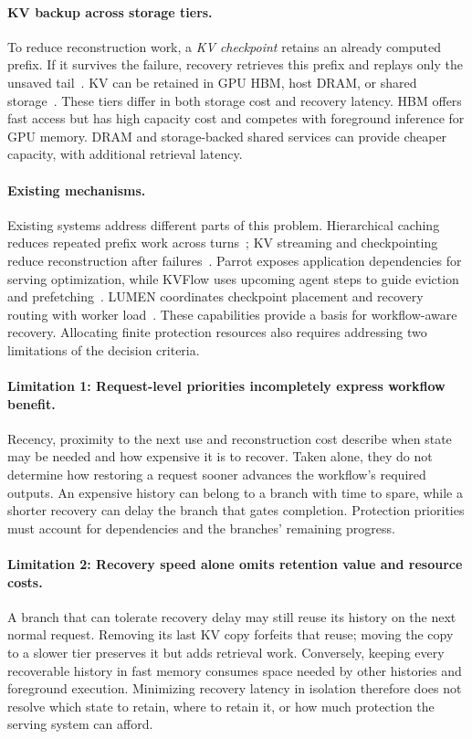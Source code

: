 \paragraph{KV backup across storage tiers.}
To reduce reconstruction work, a \emph{KV checkpoint} retains an already
computed prefix. If it survives the failure, recovery retrieves this
prefix and replays only the unsaved
tail~\cite{strati2024dejavu,jayakody2026ghostserve}.
KV can be retained in GPU HBM, host DRAM, or shared
storage~\cite{gao2024cachedattention,qin2025mooncake}.
These tiers differ in both storage cost and recovery latency.
HBM offers fast access but has high capacity cost and competes with
foreground inference for GPU memory. DRAM and storage-backed shared
services can provide cheaper capacity, with additional retrieval latency.

\paragraph{Existing mechanisms.}
Existing systems address different parts of this problem.
Hierarchical caching reduces repeated prefix work across
turns~\cite{gao2024cachedattention,qin2025mooncake}; KV streaming and
checkpointing reduce reconstruction after
failures~\cite{strati2024dejavu,jayakody2026ghostserve}.
Parrot exposes application dependencies for serving optimization, while
KVFlow uses upcoming agent steps to guide eviction and
prefetching~\cite{lin2024parrot,pan2025kvflow}. LUMEN coordinates
checkpoint placement and recovery routing with worker
load~\cite{cao2026lumen}. These capabilities provide a basis for
workflow-aware recovery. Allocating finite protection resources also
requires addressing two limitations of the decision criteria.

\paragraph{Limitation 1: Request-level priorities incompletely express
workflow benefit.}
Recency, proximity to the next use and reconstruction cost describe when
state may be needed and how expensive it is to recover. Taken alone,
they do not determine how restoring a request sooner advances the
workflow's required outputs. An expensive history can belong to a branch
with time to spare, while a shorter recovery can delay the branch that
gates completion. Protection priorities must account for dependencies
and the branches' remaining progress.

\paragraph{Limitation 2: Recovery speed alone omits retention value and
resource costs.}
A branch that can tolerate recovery delay may still reuse its history
on the next normal request. Removing its last KV copy forfeits that reuse;
moving the copy to a slower tier preserves it but adds retrieval work.
Conversely, keeping every recoverable history in fast memory consumes
space needed by other histories and foreground execution. Minimizing
recovery latency in isolation therefore does not resolve which state
to retain, where to retain it, or how much protection the serving system
can afford.

